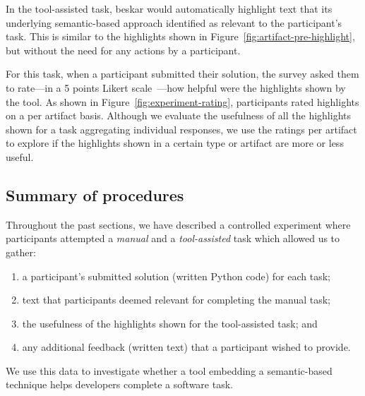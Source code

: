 In the tool-assisted task, \acs{beskar} would automatically highlight text that 
its underlying semantic-based approach identified as relevant to the participant's task.
This is similar to the highlights shown in Figure~\ref{fig:artifact-pre-highlight}, but without the need for any actions by a participant.




For this task, when a participant submitted their solution, the survey asked them to 
rate---in a 5 points Likert scale~\cite{likert1932technique}---how helpful were the highlights shown by the tool.
As shown in Figure~\ref{fig:experiment-rating}, participants rated highlights on a per artifact basis. Although we evaluate the usefulness of all the highlights shown for a task
aggregating individual responses, we use the ratings per artifact to explore if the highlights shown in a certain type or artifact are more or less useful.






\subsection{Summary of procedures}



Throughout the past sections, we have described a controlled experiment 
where participants attempted a \textit{manual} and a \textit{tool-assisted}
task which allowed us to gather:


\begin{enumerate}
\item a participant's submitted solution (written Python code) for each task;
\item text that participants deemed relevant for completing the manual task;
\item the usefulness of the highlights shown for the tool-assisted task; and
\item any additional feedback (written text) that a participant wished to provide.
\end{enumerate}


We use this data to investigate whether 
a tool embedding a semantic-based technique helps developers complete a software task. 


\clearpage









